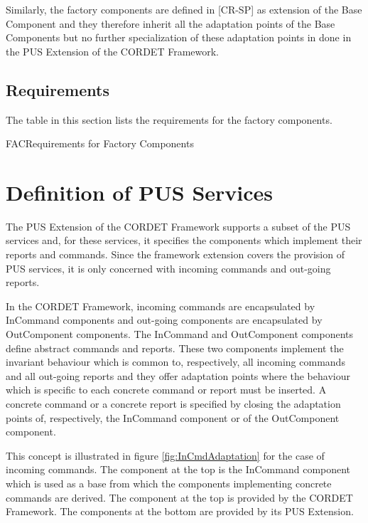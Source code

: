 \documentclass{pnp_article}
\begin{document}
Similarly, the factory components are defined in [CR-SP] as extension of the Base Component and they therefore inherit all the adaptation points of the Base Components but no further specialization of these adaptation points in done in the PUS Extension of the CORDET Framework.

\subsection{Requirements}
The table in this section lists the requirements for the factory components.

\begin{cr_req}{FAC}{Requirements for Factory Components}
\end{cr_req}


\section{Definition of PUS Services}\label{sec:defPusRepCmd}
The PUS Extension of the CORDET Framework supports a subset of the PUS services and, for these services, it specifies the components which implement their reports and commands. Since the framework extension covers the provision of PUS services, it is only concerned with incoming commands and out-going reports. 

In the CORDET Framework, incoming commands are encapsulated by InCommand components and out-going components are encapsulated by OutComponent components. The InCommand and OutComponent components define abstract commands and reports. These two components implement the invariant behaviour which is common to, respectively, all incoming commands and all out-going reports and they offer adaptation points where the behaviour which is specific to each concrete command or report must be inserted. A concrete command or a concrete report is specified by closing the adaptation points of, respectively, the InCommand component or of the OutComponent component. 

This concept is illustrated in figure \ref{fig:InCmdAdaptation} for the case of incoming commands. The component at the top is the InCommand component which is used as a base from which the components implementing concrete commands are derived. The component at the top is provided by the CORDET Framework. The components at the bottom are provided by its PUS Extension. 
\end{document}

